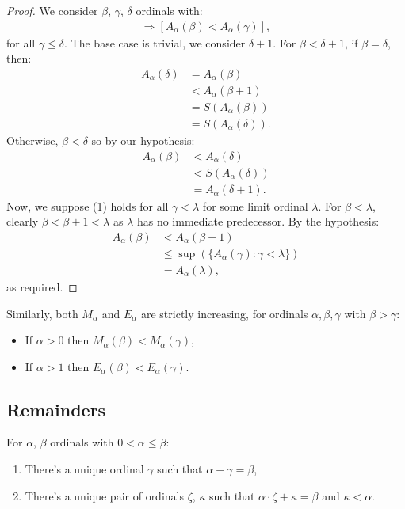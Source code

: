 \begin{proof}
    We consider $\beta$, $\gamma$, $\delta$ ordinals with: \begin{align*}
        [\beta < \gamma] \Longrightarrow [A_\alpha(\beta) < A_\alpha(\gamma)], \tag{1}
    \end{align*} for all $\gamma \leq \delta$. 
    The base case is trivial, we consider $\delta + 1$. For $\beta < \delta + 1$,
    if $\beta = \delta$, then: \begin{align*}
        A_\alpha(\delta) &= A_\alpha(\beta) \\ 
        &< A_\alpha(\beta + 1) \\
        &= S(A_\alpha(\beta)) \\
        &= S(A_\alpha(\delta)).
    \end{align*} Otherwise, $\beta < \delta$ so by our hypothesis: \begin{align*}
        A_\alpha(\beta) &< A_\alpha(\delta) \\
        &< S(A_\alpha(\delta)) \\
        &= A_\alpha(\delta + 1). 
    \end{align*} Now, we suppose (1) holds for all 
    $\gamma < \lambda$ for some limit ordinal $\lambda$. For $\beta < \lambda$,
    clearly $\beta < \beta + 1 < \lambda$ as $\lambda$ has no immediate predecessor.
    By the hypothesis: \begin{align*}
        A_\alpha(\beta) &< A_\alpha(\beta + 1) \\
        &\leq \sup(\{A_\alpha(\gamma) : \gamma < \lambda\}) \\
        &= A_\alpha(\lambda),
    \end{align*} as required.
\end{proof} \noindent
Similarly, both $M_\alpha$ and $E_\alpha$ are strictly
increasing, for ordinals $\alpha, \beta, \gamma$ with $\beta > \gamma$: 
\begin{itemize}
    \item If $\alpha > 0$ then $M_\alpha(\beta) < M_\alpha(\gamma)$,
    \item If $\alpha > 1$ then $E_\alpha(\beta) < E_\alpha(\gamma)$.
\end{itemize}

\subsection{Remainders}

For $\alpha$, $\beta$ ordinals with $0 < \alpha \leq \beta$: \begin{enumerate}
    \item There's a unique ordinal $\gamma$ such that $\alpha + \gamma = \beta$,
    \item There's a unique pair of ordinals $\zeta$, $\kappa$ such that
        $\alpha \cdot \zeta + \kappa = \beta$ and $\kappa < \alpha$.
\end{enumerate} 

